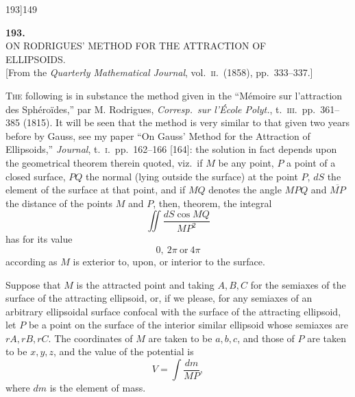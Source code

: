 \documentclass[11pt]{article}
\begin{document}
\bigskip

\noindent [A different investigation of the formula $r^{2} = L\xi^{2} + M\eta^{2} + N\zeta^{2}$, by Dr Ferrers, was appended to the original Paper.]

\bigskip

\begin{center}\small 193]\hfill\hfill 149\end{center}

\bigskip
\bigskip

\begin{center}
{\Large\bfseries 193.}\\[10pt]
{\large ON RODRIGUES' METHOD FOR THE ATTRACTION OF\\
ELLIPSOIDS.}\\[6pt]
\small [From the \emph{Quarterly Mathematical Journal}, vol.~\textsc{ii}.\ (1858), pp.~333--337.]
\end{center}

\bigskip

\noindent\textsc{The} following is in substance the method given in the ``M\'{e}moire sur l'attraction des Sph\'{e}ro\"{i}des,'' par M. Rodrigues, \emph{Corresp.\ sur l'\'{E}cole Polyt.}, t.~\textsc{iii}.\ pp.~361--385 (1815). It will be seen that the method is very similar to that given two years before by Gauss, see my paper ``On Gauss' Method for the Attraction of Ellipsoids,'' \emph{Journal}, t.~\textsc{i}.\ pp.~162--166 [164]: the solution in fact depends upon the geometrical theorem therein quoted, viz.\ if $M$ be any point, $P$ a point of a closed surface, $PQ$ the normal (lying outside the surface) at the point $P$, $dS$ the element of the surface at that point, and if $MQ$ denotes the angle $MPQ$ and $\overline{MP}$ the distance of the points $M$ and $P$, then, theorem, the integral
\[
\iint \frac{dS\cos MQ}{MP^{2}}
\]
has for its value
\[
0,\ 2\pi\ \text{or}\ 4\pi
\]
according as $M$ is exterior to, upon, or interior to the surface.

Suppose that $M$ is the attracted point and taking $A, B, C$ for the semiaxes of the surface of the attracting ellipsoid, or, if we please, for any semiaxes of an arbitrary ellipsoidal surface confocal with the surface of the attracting ellipsoid, let $P$ be a point on the surface of the interior similar ellipsoid whose semiaxes are $rA, rB, rC$. The coordinates of $M$ are taken to be $a, b, c$, and those of $P$ are taken to be $x, y, z$, and the value of the potential is
\[
V = \int\frac{dm}{MP},
\]
where $dm$ is the element of mass.
\end{document}
